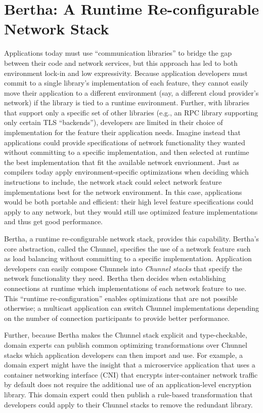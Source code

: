 \section{Bertha: A Runtime Re-configurable Network Stack}

Applications today must use ``communication libraries'' to bridge the gap between their code and network services, but this approach has led to both environment lock-in and low expressivity. Because application developers must commit to a single library's implementation of each feature, they cannot easily move their application to a different environment (say, a different cloud provider's network) if the library is tied to a runtime environment.
Further, with libraries that support only a specific set of other libraries (e.g., an RPC library supporting only certain TLS ``backends''), developers are limited in their choice of implementation for the feature their application needs.
Imagine instead that applications could provide specifications of network functionality they wanted without committing to a specific implementation, and then selected at runtime the best implementation that fit the available network envrionment. 
Just as compilers today apply environment-specific optimizations when deciding which instructions to include, the network stack could select network feature implementations best for the network environment. 
In this case, applications would be both portable and efficient: their high level feature specifications could apply to any network, but they would still use optimized feature implementations and thus get good performance.

Bertha, a runtime re-configurable network stack, provides this capability. 
Bertha's core abstraction, called the Chunnel, specifies the use of a network feature such as load balancing without committing to a specific implementation. Application developers can easily compose Chunnels into \emph{Chunnel stacks} that specify the network functionality they need.
Bertha then decides when establishing connections at runtime which implementations of each network feature to use. This ``runtime re-configuration'' enables optimizations that are not possible otherwise; \eg a multicast application can switch Chunnel implementations depending on the number of connection participants to provide better performance.

Further, because Bertha makes the Chunnel stack explicit and type-checkable, domain experts can publish common optimizing transformations over Chunnel stacks which application developers can then import and use. 
For example, a domain expert might have the insight that a microservice application that uses a container networking interface (CNI) that encrypts inter-container network traffic by default does not require the additional use of an application-level encryption library. 
This domain expert could then publish a rule-based transformation that developers could apply to their Chunnel stacks to remove the redundant library.

